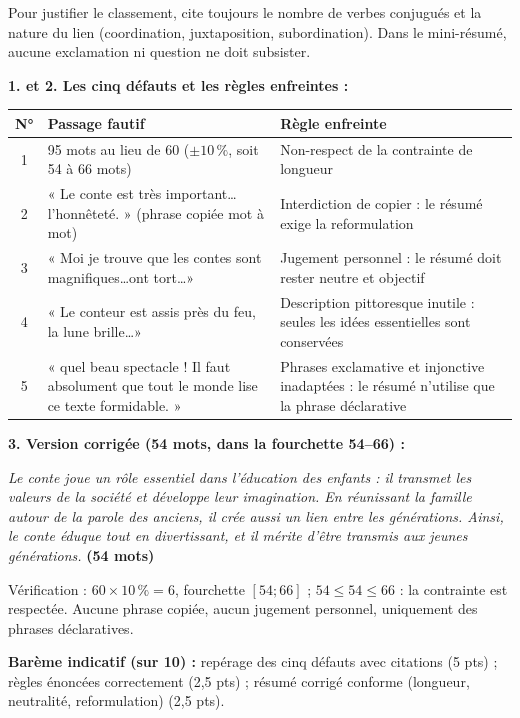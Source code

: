 \documentclass[11pt]{article}
\begin{document}
\begin{attention}
Pour justifier le classement, cite toujours le nombre de verbes conjugués et la nature du lien (coordination, juxtaposition, subordination). Dans le mini-résumé, aucune exclamation ni question ne doit subsister.
\end{attention}

\begin{corrige}
\textbf{1. et 2. Les cinq défauts et les règles enfreintes :}

\begin{center}
\begin{tabularx}{\linewidth}{|c|X|X|}
\hline
\rowcolor{popblueL} N° & Passage fautif & Règle enfreinte \\
\hline
1 & 95 mots au lieu de 60 ($\pm 10\,\%$, soit 54 à 66 mots) & Non-respect de la contrainte de longueur \\
\hline
2 & « Le conte est très important\ldots l'honnêteté. » (phrase copiée mot à mot) & Interdiction de copier : le résumé exige la reformulation \\
\hline
3 & « Moi je trouve que les contes sont magnifiques\ldots ont tort\ldots » & Jugement personnel : le résumé doit rester neutre et objectif \\
\hline
4 & « Le conteur est assis près du feu, la lune brille\ldots » & Description pittoresque inutile : seules les idées essentielles sont conservées \\
\hline
5 & « quel beau spectacle ! Il faut absolument que tout le monde lise ce texte formidable. » & Phrases exclamative et injonctive inadaptées : le résumé n'utilise que la phrase déclarative \\
\hline
\end{tabularx}
\end{center}

\textbf{3. Version corrigée (54 mots, dans la fourchette 54--66) :}

\emph{Le conte joue un rôle essentiel dans l'éducation des enfants : il transmet les valeurs de la société et développe leur imagination. En réunissant la famille autour de la parole des anciens, il crée aussi un lien entre les générations. Ainsi, le conte éduque tout en divertissant, et il mérite d'être transmis aux jeunes générations.} \textbf{(54 mots)}

Vérification : $60 \times 10\,\% = 6$, fourchette $[54 ; 66]$ ; $54 \leq 54 \leq 66$ : la contrainte est respectée. Aucune phrase copiée, aucun jugement personnel, uniquement des phrases déclaratives.

\textbf{Barème indicatif (sur 10) :} repérage des cinq défauts avec citations (5 pts) ; règles énoncées correctement (2,5 pts) ; résumé corrigé conforme (longueur, neutralité, reformulation) (2,5 pts).
\end{corrige}
\end{document}

